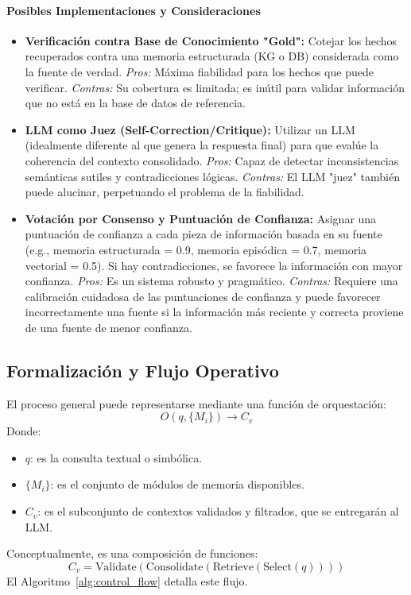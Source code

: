 \documentclass[journal,onecolumn]{IEEEtran}
\begin{document}
\paragraph{Posibles Implementaciones y Consideraciones}
\begin{itemize}
    \item \textbf{Verificación contra Base de Conocimiento "Gold":} Cotejar los hechos recuperados contra una memoria estructurada (KG o DB) considerada como la fuente de verdad. \textit{Pros:} Máxima fiabilidad para los hechos que puede verificar. \textit{Contras:} Su cobertura es limitada; es inútil para validar información que no está en la base de datos de referencia.
    \item \textbf{LLM como Juez (Self-Correction/Critique):} Utilizar un LLM (idealmente diferente al que genera la respuesta final) para que evalúe la coherencia del contexto consolidado. \textit{Pros:} Capaz de detectar inconsistencias semánticas sutiles y contradicciones lógicas. \textit{Contras:} El LLM "juez" también puede alucinar, perpetuando el problema de la fiabilidad.
    \item \textbf{Votación por Consenso y Puntuación de Confianza:} Asignar una puntuación de confianza a cada pieza de información basada en su fuente (e.g., memoria estructurada = 0.9, memoria episódica = 0.7, memoria vectorial = 0.5). Si hay contradicciones, se favorece la información con mayor confianza. \textit{Pros:} Es un sistema robusto y pragmático. \textit{Contras:} Requiere una calibración cuidadosa de las puntuaciones de confianza y puede favorecer incorrectamente una fuente si la información más reciente y correcta proviene de una fuente de menor confianza.
\end{itemize}

\subsection{Formalización y Flujo Operativo}
El proceso general puede representarse mediante una función de orquestación:
\[
O(q, \{M_i\}) \rightarrow C_v
\]
Donde:
\begin{itemize}
    \item $q$: es la consulta textual o simbólica.
    \item $\{M_i\}$: es el conjunto de módulos de memoria disponibles.
    \item $C_v$: es el subconjunto de contextos validados y filtrados, que se entregarán al LLM.
\end{itemize}
Conceptualmente, es una composición de funciones:
\[
C_v = \text{Validate}(\text{Consolidate}(\text{Retrieve}(\text{Select}(q))))
\]
El Algoritmo~\ref{alg:control_flow} detalla este flujo.
\end{document}
